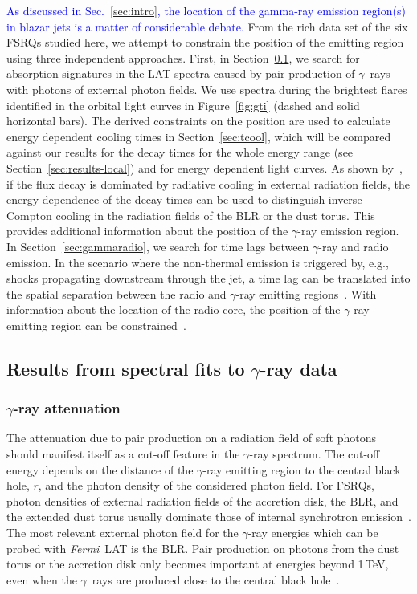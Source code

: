 \documentclass[twocolumn,linenumbers]{aastex62}
\newcommand{\Grays}{$\gamma$~rays\xspace}
\newcommand{\gray}{$\gamma$-ray\xspace}
\newcommand{\FermiLAT}{\emph{Fermi}~LAT\xspace}
\newcommand{\response}[1]{\textcolor{blue}{#1}}
\begin{document}
\response{
As discussed in Sec.~\ref{sec:intro}, the location of the gamma-ray emission region(s) in blazar jets is a matter of considerable debate.
}
From the rich data set of the six FSRQs studied here, we attempt to constrain the position of the emitting region using three independent approaches. 
First, in Section~\ref{sec:blrabs}, we search for absorption signatures in the LAT spectra caused by pair production of \Grays with photons of external photon fields. We use spectra during the brightest flares identified in the orbital light curves in Figure~\ref{fig:gti} (dashed and solid horizontal bars).
The derived constraints on the position are used to calculate energy dependent cooling times in Section~\ref{sec:tcool}, which will be compared against our results for the decay times for the whole energy range (see Section~\ref{sec:results-local}) and for energy dependent light curves.
As shown by~\citet{2012ApJ...758L..15D}, if the flux decay is dominated by radiative cooling in external radiation fields, the energy dependence of the decay times can be used to distinguish inverse-Compton cooling in the radiation fields of the BLR or the dust torus.
This provides additional information about the position of the \gray emission region.
In Section~\ref{sec:gammaradio}, we search for time lags between \gray and radio emission. 
In the scenario where the non-thermal emission is triggered by, e.g., shocks propagating downstream through the jet, a time lag can be translated into the spatial separation between the radio and \gray emitting regions~\citep{2014MNRAS.445..428M}. 
With information about the location of the radio core, the position of the \gray emitting region can be constrained~\citep[e.g.,][]{2014MNRAS.441.1899F}. 

\subsection{Results from spectral fits to \gray data}
\label{sec:blrabs}
\subsubsection{\gray attenuation}
The attenuation due to pair production on a radiation field of soft photons should manifest itself as a cut-off feature in the \gray spectrum. 
The cut-off energy depends on the distance of the \gray emitting region to the central black hole, $r$, and the photon density of the considered photon field.
For FSRQs, photon densities of external radiation fields of the accretion disk, the BLR, and the extended dust torus usually dominate those of internal synchrotron emission~\citep[see,e.g.,][]{2012ApJ...758L..15D}.
The most relevant external photon field for the \gray energies which can be probed with \FermiLAT is the BLR. 
Pair production on photons from the dust torus or the accretion disk only becomes important at energies beyond 1\,TeV, even when the \Grays are produced close to the central black hole~\citep{finke2016}.
\end{document}
